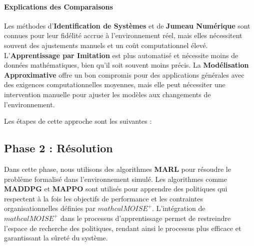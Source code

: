 \documentclass[sigconf,anonymous]{aamas}
\begin{document}
\paragraph{Explications des Comparaisons}

Les méthodes d'\textbf{Identification de Systèmes} et de \textbf{Jumeau Numérique} sont connues pour leur fidélité accrue à l'environnement réel, mais elles nécessitent souvent des ajustements manuels et un coût computationnel élevé. L'\textbf{Apprentissage par Imitation} est plus automatisé et nécessite moins de données mathématiques, bien qu'il soit souvent moins précis. La \textbf{Modélisation Approximative} offre un bon compromis pour des applications générales avec des exigences computationnelles moyennes, mais elle peut nécessiter une intervention manuelle pour ajuster les modèles aux changements de l'environnement.

Les étapes de cette approche sont les suivantes :



\subsection{Phase 2 : Résolution}
Dans cette phase, nous utilisons des algorithmes \textbf{MARL} pour résoudre le problème formalisé dans l'environnement simulé. Les algorithmes comme \textbf{MADDPG} et \textbf{MAPPO} sont utilisés pour apprendre des politiques qui respectent à la fois les objectifs de performance et les contraintes organisationnelles définies par \textbf{$mathcal{M}OISE^+$}. L'intégration de \textbf{$mathcal{M}OISE^+$} dans le processus d'apprentissage permet de restreindre l'espace de recherche des politiques, rendant ainsi le processus plus efficace et garantissant la sûreté du système.
\end{document}

